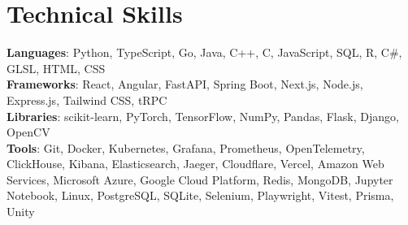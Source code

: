 \documentclass[letterpaper,11pt]{article}
\begin{document}
\section{Technical Skills}
 \begin{itemize}[leftmargin=0.15in, label={}]
    \small{\item{
     \textbf{Languages}{: Python, TypeScript, Go, Java, C++, C, JavaScript, SQL, R, C\#, GLSL, HTML, CSS} \\
     \textbf{Frameworks}{: React, Angular, FastAPI, Spring Boot, Next.js, Node.js, Express.js, Tailwind CSS, tRPC} \\
     \textbf{Libraries}{: scikit-learn, PyTorch, TensorFlow, NumPy, Pandas, Flask, Django, OpenCV} \\
     \textbf{Tools}{: Git, Docker, Kubernetes, Grafana, Prometheus, OpenTelemetry, ClickHouse, Kibana, Elasticsearch, Jaeger, Cloudflare, Vercel, Amazon Web Services, Microsoft Azure, Google Cloud Platform, Redis, MongoDB, Jupyter Notebook, Linux, PostgreSQL, SQLite, Selenium, Playwright, Vitest, Prisma, Unity} \\
    }}
 \end{itemize}

\end{document}

